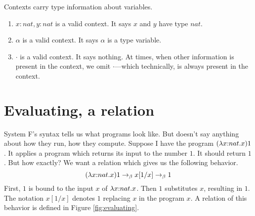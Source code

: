 Contexts carry type information about variables. 
\begin{enumerate}[label=\alph*)]
\item $x{:}nat, y{:}nat$ is a valid context. It says $x$ and $y$ have type $nat$.  
\item $\alpha$ is a valid context. It says $\alpha$ is a type variable.
\item $\cdot$ is a valid context. It says nothing. At times, when other information is present in the context, we omit $\cdot$---which technically, is always present in the context.
\end{enumerate}



\section{Evaluating, a relation}

System F's syntax tells us what programs look like. But doesn't say anything about how they run, how they compute. Suppose I have the program $(\lambda x{:}nat.x)1$. It applies a program which returns its input to the number $1$. It should return $1$. But how exactly? We want a relation which gives us the following behavior.
$$(\lambda x{:}nat.x)1 \to_\beta x[1/x] \to_\beta 1$$
First, $1$ is bound to the input $x$ of $\lambda x{:}nat.x$. Then $1$ substitutes $x$, resulting in $1$. The notation $x[1/x]$ denotes $1$ replacing $x$ in the program $x$. A relation of this behavior is defined in Figure \ref{fig:evaluating}.

